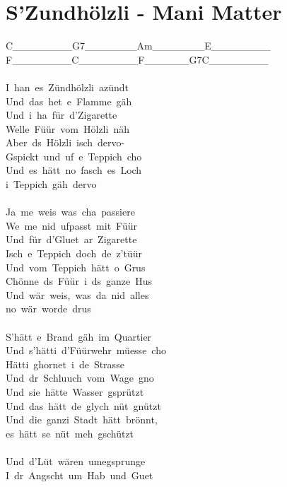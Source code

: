 \documentclass[]{book}
\let\stdsection\section
\renewcommand\section{\clearpage\stdsection}
\begin{document}
\hypertarget{szundholzli---mani-matter}{%
\section{S'Zundhölzli - Mani Matter}\label{szundholzli---mani-matter}}

\textbar C\_\_\_\_\_\_\_\_\textbar G7\_\_\_\_\_\_\_\textbar Am\_\_\_\_\_\_\_\textbar E\_\_\_\_\_\_\_\_\textbar{}\\
\textbar F\_\_\_\_\_\_\_\_\textbar C\_\_\_\_\_\_\_\_\textbar F\_\_\_\_\_\_G7\textbar C\_\_\_\_\_\_\_\_\textbar{}\\
~\\
I~han~es~Zündhölzli~azündt\\
Und~das~het~e~Flamme~gäh\\
Und~i~ha~für~d'Zigarette\\
Welle~Füür~vom~Hölzli~näh\\
Aber~ds~Hölzli~isch~dervo-\\
Gspickt~und~uf~e~Teppich~cho\\
Und~es~hätt~no~fasch~es~Loch~\\
i~Teppich~gäh~dervo\\
~\\
Ja~me~weis~was~cha~passiere\\
We~me~nid~ufpasst~mit~Füür\\
Und~für~d'Gluet~ar~Zigarette\\
Isch~e~Teppich~doch~de~z'tüür\\
Und~vom~Teppich~hätt~o~Grus\\
Chönne~ds~Füür~i~ds~ganze~Hus\\
Und~wär~weis,~was~da~nid~alles~\\
no~wär~worde~drus\\
~\\
S'hätt~e~Brand~gäh~im~Quartier\\
Und~s'hätti~d'Füürwehr~müesse~cho\\
Hätti~ghornet~i~de~Strasse\\
Und~dr~Schluuch~vom~Wage~gno\\
Und~sie~hätte~Wasser~gsprützt\\
Und~das~hätt~de~glych~nüt~gnützt\\
Und~die~ganzi~Stadt~hätt~brönnt,~\\
es~hätt~se~nüt~meh~gschützt\\
~\\
Und~d'Lüt~wären~umegsprunge\\
I~dr~Angscht~um~Hab~und~Guet\\
\end{document}
